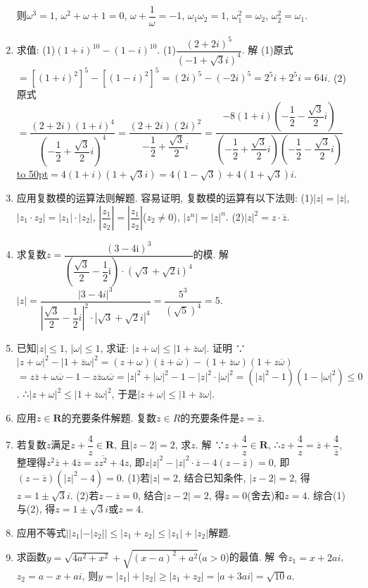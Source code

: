\documentclass[10pt,a4paper]{article}
\newcommand{\blank}[1]{\underline{\hbox to #1pt{}}}
\begin{document}
\begin{enumerate}[1.]
则$\omega ^3=1$, $\omega ^2+\omega +1=0$, $\omega +\dfrac 1{\omega }=-1$, $\omega _1\omega _2=1$, $\omega _1^2=\omega _2$, $\omega _2^2=\omega _1$.
\item 求值:
(1)$(1+i)^{10}-(1-i)^{10}$.
(1)$\dfrac{{{(2+2i)}^5}}{{{(-1+\sqrt 3i)}^4}}$.
解  (1)原式$=[(1+i)^2]^5-[(1-i)^2]^5=(2i)^5-(-2i)^5=2^5i+2^5i=64i$.
(2)原式$=\dfrac{(2+2i){{(1+i)}^4}}{{{(-\dfrac 12+\dfrac{\sqrt 3}2i)}^4}}=\dfrac{(2+2i){{(2i)}^2}}{-\dfrac 12+\dfrac{\sqrt 3}2i}=\dfrac{-8(1+i)(-\dfrac 12-\dfrac{\sqrt 3}2i)}{(-\dfrac 12+\dfrac{\sqrt 3}2i)(-\dfrac 12-\dfrac{\sqrt 3}2i)}$
\blank{50}$=4(1+i)(1+\sqrt 3i)=4(1-\sqrt 3)+4(1+\sqrt 3)i$.
\item 应用复数模的运算法则解题.
容易证明, 复数模的运算有以下法则:
(1)$|z|=|\overline z|$, $|z_1\cdot z_2|=|z_1|\cdot|z_2|$, $|\dfrac{z_1}{z_2}|=|\dfrac{z_1}{z_2}|$($z_2\ne 0$), $|z^n|=|z|^n$.
(2)$|z|^2=z\cdot \overline z$.
\item 求复数$z=\dfrac{{{(3-4\mathrm{i})}^3}}{(\dfrac{\sqrt 3}2-\dfrac 12\mathrm{i})\cdot {{(\sqrt 3+\sqrt 2\mathrm{i})}^4}}$的模.
解  $|z|=\dfrac{{{|3-4i|}^3}}{{{|\dfrac{\sqrt 3}2-\dfrac 12i|}^2}\cdot {{|\sqrt 3+\sqrt 2i|}^4}}=\dfrac{5^3}{{{(\sqrt 5)}^4}}=5$.
\item 已知$|z|\le 1$, $|\omega|\le 1$, 求证: $|z+\omega|\le|1+\overline z\omega|$.
证明  ∵$|z+\omega|^2-|1+\overline z\omega|^2=(z+\omega)(\overline z+\overline \omega)-(1+\overline z\omega)(1+z\overline \omega)$
$=z\overline z+\omega \overline \omega -1-z\overline z\omega \overline \omega =|z|^2+|\omega|^2-1-|z|^2\cdot|\omega|^2=(|z|^2-1)(1-|\omega|^2)\le 0$.
∴$|z+\omega|^2\le|1+\overline z\omega|^2$, 于是$|z+\omega|\le|1+\overline z\omega|$.
\item 应用$z\in \mathbf{R}$的充要条件解题.
复数$z\in R$的充要条件是$z=\overline z$.
\item 若复数$z$满足$z+\dfrac 4z\in \mathbf{R}$, 且$|z-2|=2$, 求$z$.
解  ∵$z+\dfrac 4z\in \mathbf{R}$, ∴$z+\dfrac 4z=\overline z+\dfrac 4{\overline z}$, 整理得$z^2\overline z+4\overline z=z\overline{z^2}+4z$,
即$z|z|^2-|z|^2\cdot \overline z-4(z-\overline z)=0$, 即$(z-\overline z)(|z|^2-4)=0$.
(1)若$|z|=2$, 结合已知条件, $|z-2|=2$, 得$z=1\pm \sqrt 3i$.
(2)若$z-\overline z=0$, 结合$|z-2|=2$, 得$z=0$(舍去)和$z=4$.
综合(1)与(2), 得$z=1\pm \sqrt 3i$或$z=4$.
\item 应用不等式$||z_1|-|z_2||\le|z_1+z_2|\le|z_1|+|z_2|$解题.
\item 求函数$y=\sqrt {4a^2+x^2}+\sqrt {(x-a)^2+a^2}$($a>0$)的最值.
解  令$z_1=x+2ai$, $z_2=a-x+ai$,
则$y=|z_1|+|z_2|\ge|z_1+z_2|=|a+3ai|=\sqrt {10}a$.

\end{enumerate}
\end{document}

